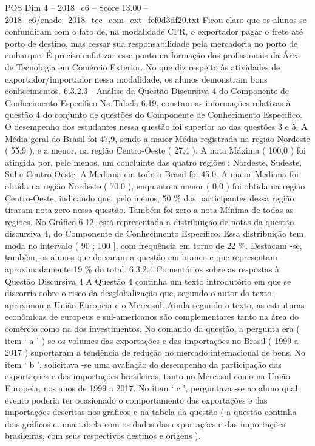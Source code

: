 \begin{textsample}{POS Dim 4 – 2018\_c6 – Score 13.00 – 2018\_c6/enade\_2018\_tec\_com\_ext\_fef0d3df20.txt}
Ficou claro que os alunos se confundiram com o fato de, na modalidade CFR, o exportador pagar o frete até porto de destino, mas cessar sua responsabilidade pela mercadoria no porto de embarque.
É preciso enfatizar esse ponto na formação dos profissionais da Área de Tecnologia em Comércio Exterior.
No que diz respeito às atividades de exportador/importador nessa modalidade, os alunos demonstram bons conhecimentos. 6.3.2.3 - Análise da Questão Discursiva 4 do Componente de Conhecimento Específico Na Tabela 6.19, constam as informações relativas à questão 4 do conjunto de questões do Componente de Conhecimento Específico.
O desempenho dos estudantes nessa questão foi superior ao das questões 3 e 5.
A Média geral do Brasil foi 47,9, sendo a maior Média registrada na região Nordeste ( 55,9 ), e a menor, na região Centro-Oeste ( 27,4 ).
A nota Máxima ( 100,0 ) foi atingida por, pelo menos, um concluinte das quatro regiões : Nordeste, Sudeste, Sul e Centro-Oeste.
A Mediana em todo o Brasil foi 45,0.
A maior Mediana foi obtida na região Nordeste ( 70,0 ), enquanto a menor ( 0,0 ) foi obtida na região Centro-Oeste, indicando que, pelo menos, 50 \% dos participantes dessa região tiraram nota zero nessa questão.
Também foi zero a nota Mínima de todas as regiões.
No Gráfico 6.12, está representada a distribuição de notas da questão discursiva 4, do Componente de Conhecimento Específico.
Essa distribuição tem moda no intervalo ( 90 ; 100 ], com frequência em torno de 22 \%.
Destacam -se, também, os alunos que deixaram a questão em branco e que representam aproximadamente 19 \% do total. 6.3.2.4 Comentários sobre as respostas à Questão Discursiva 4 A Questão 4 continha um texto introdutório em que se discorria sobre o risco da desglobalização que, segundo o autor do texto, aproximou a União Europeia e o Mercosul.
Ainda segundo o texto, as estruturas econômicas de europeus e sul-americanos são complementares tanto na área do comércio como na dos investimentos.
No comando da questão, a pergunta era ( item ‘ a ’ ) se os volumes das exportações e das importações no Brasil ( 1999 a 2017 ) suportaram a tendência de redução no mercado internacional de bens.
No item ‘ b ’, solicitava -se uma avaliação do desempenho da participação das exportações e das importações brasileiras, tanto no Mercosul como na União Europeia, nos anos de 1999 a 2017.
No item ‘ c ’, perguntava -se ao aluno qual evento poderia ter ocasionado o comportamento das exportações e das importações descritas nos gráficos e na tabela da questão ( a questão continha dois gráficos e uma tabela com os dados das exportações e das importações brasileiras, com seus respectivos destinos e origens ).

\end{textsample}
